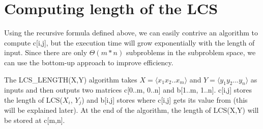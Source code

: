 \documentclass{report}
\begin{document}
    \section{Computing length of the LCS}
    Using the recursive formula defined above, we can easily contrive an algorithm to compute c[i,j], but the execution time will grow exponentially with the length of input. Since there are only $\Theta(m*n)$ subproblems in the subproblem space, we can use the bottom-up approach to improve efficiency.
    
    \bigskip
    The LCS\_LENGTH(X,Y) algorithm takes $X=\langle x_1x_2..x_m\rangle$ and $Y = \langle y_1y_2...y_n\rangle$ as inputs and then outputs two matrices c[0..m, 0..n] and b[1..m, 1..n]. c[i,j] stores the length of LCS($X_i$, $Y_j$) and b[i,j] stores where c[i,j] gets its value from (this will be explained later). At the end of the algorithm, the length of LCS(X,Y) will be stored at c[m,n].
    
\end{document}

